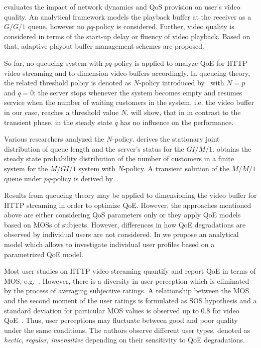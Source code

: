 \cite{Luan2010} evaluates the impact of network dynamics and \gls{QoS} provision on user's video quality. 
An analytical framework models the playback buffer at the receiver as a \(G/G/1\) queue, however no \(pq\)-policy is considered. 
Further, video quality is considered in terms of the start-up delay or fluency of video playback. 
Based on that, adaptive playout buffer management schemes are proposed. 

So far, no queueing system with \(pq\)-policy is applied to analyze \gls{QoE} for \gls{HTTP} video streaming and to dimension video buffers accordingly.
In queueing theory, the related threshold policy is denoted as \(N\)-policy introduced by~\cite{Yadin1963} with \(N=p\) and \(q=0\); the server stops whenever the system becomes empty and resumes service when the number of waiting customers in the system, i.e. the video buffer in our case, reaches a threshold value \(N\).
 will show, that in in contrast to the transient phase, in the steady state \(q\) has no influence on the performance. 

Various researchers analyzed the \(N\)-policy.
\cite{Zhang2004} derives the stationary joint distribution of queue length and the server's status for the \(GI/M/1\).
\cite{Wang2000} obtains the steady state probability distribution of the number of customers in a finite system for the \(M/GI/1\) system with \(N\)-policy.
A transient solution of the \(M/M/1\) queue under \(pq\)-policy is derived by~\cite{Boehm1993}.

Results from queueing theory may be applied to dimensioning the video buffer for \gls{HTTP} streaming in order to optimize \gls{QoE}. 
However, the approaches mentioned above are either considering \gls{QoS} parameters only or they apply \gls{QoE} models based on \glspl{MOS} of subjects.
However, differences in how \gls{QoE} degradations are observed by individual users are not considered.
In  we propose an analytical model which allows to investigate individual user profiles based on a parametrized QoE model.

Most user studies on \gls{HTTP} video streaming quantify and report \gls{QoE} in terms of \gls{MOS}, e.g.~\cite{Hossfeld2013c}.
However, there is a diversity in user perception which is eliminated by the process of averaging subjective ratings.
A relationship between the \gls{MOS} and the second moment of the user ratings is formulated as \gls{SOS} hypothesis and a standard deviation for particular \gls{MOS} values is observed up to \(0.8\) for video \gls{QoE}~\cite{Hossfeld2011b}. 
Thus, user perceptions may fluctuate between good and poor quality under the same conditions. The authors observe different user types, denoted as \emph{hectic}, \emph{regular}, \emph{insensitive} depending on their sensitivity to \gls{QoE} degradations.

